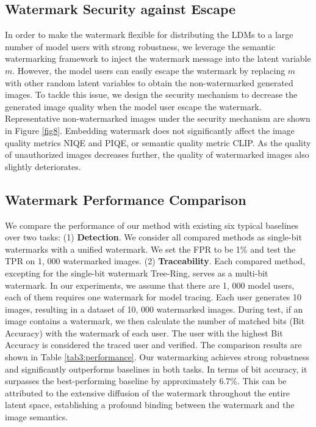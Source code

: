 \subsection{Watermark Security against Escape}

In order to make the watermark flexible for distributing the LDMs to a large number of model users with strong robustness, we leverage the semantic watermarking framework to inject the watermark message into the latent variable $m$. However, the model users can easily escape the watermark by replacing $m$ with other random latent variables to obtain the non-watermarked generated images. To tackle this issue, we design the security mechanism to decrease the generated image quality when the model user escape the watermark. Representative non-watermarked images under the security mechanism are shown in Figure \ref{fig8}. Embedding watermark does not significantly affect the image quality metrics NIQE and PIQE, or semantic quality metric CLIP. As the quality of unauthorized images decreases further, the quality of watermarked images also slightly deteriorates.




\subsection{Watermark Performance Comparison}
We compare the performance of our method with existing six typical baselines over two tasks: (1) \textbf{Detection}. We consider all compared methods as single-bit watermarks with a unified watermark. We set the FPR to be 1\% and test the TPR on 1, 000 watermarked images. (2) \textbf{Traceability}. Each compared method, excepting for the single-bit watermark Tree-Ring, serves as a multi-bit watermark. In our experiments, we assume that there are 1, 000 model users, each of them requires one watermark for model tracing. Each user generates 10 images, resulting in a dataset of 10, 000 watermarked images. During test, if an image contains a watermark, we then calculate the number of matched bits (Bit Accuracy) with the watermark of each user. The user with the highest Bit Accuracy is considered the traced user and verified. The comparison results are shown in Table \ref{tab3:performance}. Our watermarking achieves
strong robustness and significantly outperforms baselines in
both tasks. In terms of bit accuracy, it surpasses the
best-performing baseline by approximately 6.7\%. This can
be attributed to the extensive diffusion of the watermark
throughout the entire latent space, establishing a profound
binding between the watermark and the image semantics.



